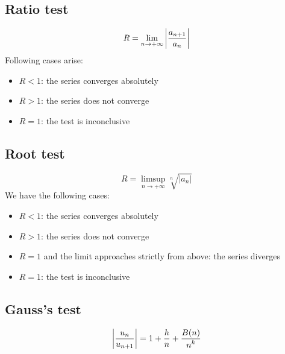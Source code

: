 \subsection{Ratio test}
	\begin{theorem}
		\begin{equation}
			R = \lim_{n\rightarrow+\infty}\left|\stylefrac{a_{n+1}}{a_n}\right|
		\end{equation}
		Following cases arise:
        \begin{itemize}
			\item $R < 1$: the series converges absolutely
            \item $R > 1$: the series does not converge
            \item $R = 1$: the test is inconclusive
		\end{itemize}
	\end{theorem}
    
\subsection{Root test}
	\begin{theorem}
		\begin{equation}
			R = \limsup_{n\rightarrow+\infty}\sqrt[n]{|a_n|}
		\end{equation}
        We have the following cases:
        \begin{itemize}
			\item $R < 1$: the series converges absolutely
            \item $R > 1$: the series does not converge
            \item $R = 1$ and the limit approaches strictly from above: the series diverges
            \item $R = 1$: the test is inconclusive
		\end{itemize}
	\end{theorem}

\subsection{Gauss's test}
	\begin{equation}
		\label{series:gauss_test}
        \left|\stylefrac{u_n}{u_{n+1}}\right| = 1 + \stylefrac{h}{n} + \stylefrac{B(n)}{n^k}
	\end{equation}
    
